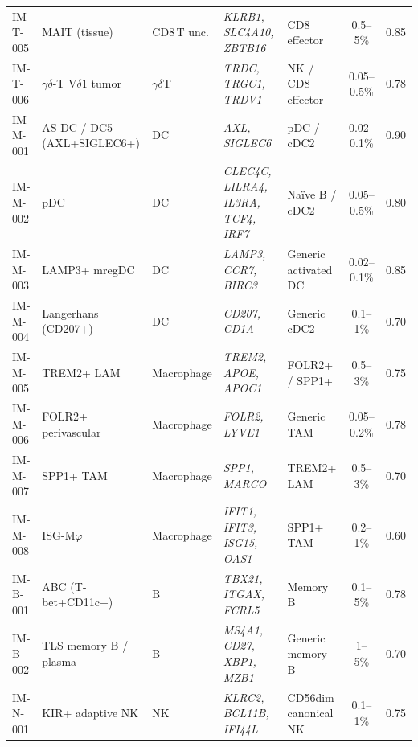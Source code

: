\begin{longtable}{@{}l l l p{32mm} p{30mm} c l@{}}
IM-T-005 & MAIT (tissue)             & CD8\,T unc.   & \textit{KLRB1, SLC4A10, ZBTB16}           & CD8 effector                           & 0.5--5\%     & 0.85 \\
IM-T-006 & $\gamma\delta$-T V$\delta1$ tumor & $\gamma\delta$T & \textit{TRDC, TRGC1, TRDV1}           & NK / CD8 effector                      & 0.05--0.5\%  & 0.78 \\
IM-M-001 & AS DC / DC5 (AXL+SIGLEC6+) & DC           & \textit{AXL, SIGLEC6}                     & pDC / cDC2                             & 0.02--0.1\%  & 0.90 \\
IM-M-002 & pDC                       & DC            & \textit{CLEC4C, LILRA4, IL3RA, TCF4, IRF7}& Naïve B / cDC2                         & 0.05--0.5\%  & 0.80 \\
IM-M-003 & LAMP3+ mregDC             & DC            & \textit{LAMP3, CCR7, BIRC3}               & Generic activated DC                   & 0.02--0.1\%  & 0.85 \\
IM-M-004 & Langerhans (CD207+)       & DC            & \textit{CD207, CD1A}                      & Generic cDC2                           & 0.1--1\%     & 0.70 \\
IM-M-005 & TREM2+ LAM                & Macrophage    & \textit{TREM2, APOE, APOC1}               & FOLR2+ / SPP1+                          & 0.5--3\%     & 0.75 \\
IM-M-006 & FOLR2+ perivascular       & Macrophage    & \textit{FOLR2, LYVE1}                      & Generic TAM                            & 0.05--0.2\%  & 0.78 \\
IM-M-007 & SPP1+ TAM                 & Macrophage    & \textit{SPP1, MARCO}                       & TREM2+ LAM                             & 0.5--3\%     & 0.70 \\
IM-M-008 & ISG-M$\varphi$            & Macrophage    & \textit{IFIT1, IFIT3, ISG15, OAS1}         & SPP1+ TAM                               & 0.2--1\%     & 0.60 \\
IM-B-001 & ABC (T-bet+CD11c+)        & B             & \textit{TBX21, ITGAX, FCRL5}               & Memory B                               & 0.1--5\%     & 0.78 \\
IM-B-002 & TLS memory B / plasma     & B             & \textit{MS4A1, CD27, XBP1, MZB1}           & Generic memory B                       & 1--5\%       & 0.70 \\
IM-N-001 & KIR+ adaptive NK          & NK            & \textit{KLRC2, BCL11B, IFI44L}             & CD56dim canonical NK                   & 0.1--1\%     & 0.75 \\

\end{longtable}
